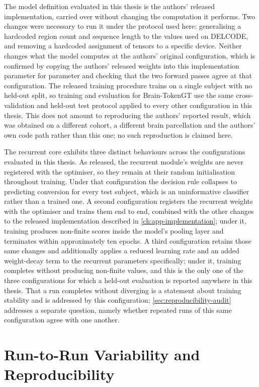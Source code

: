 The model definition evaluated in this thesis is the authors' released implementation,
carried over without changing the computation it performs. Two changes were necessary to
run it under the protocol used here: generalising a hardcoded region count and sequence
length to the values used on \ac{DELCODE}, and removing a hardcoded assignment of tensors
to a specific device. Neither changes what the model computes at the authors' original
configuration, which is confirmed by copying the authors' released
weights into this implementation parameter for parameter and checking that the two forward
passes agree at that configuration. The released training procedure trains on a single
subject with no held-out split, so training and evaluation for Brain-TokenGT use the same
cross-validation and held-out test protocol applied to every other configuration in this
thesis. This
does not amount to reproducing the authors' reported result, which was obtained on a
different cohort, a different brain parcellation and the authors' own code path rather than
this one; no such reproduction is claimed here.

The recurrent core exhibits three distinct behaviours across the configurations evaluated
in this thesis. As released, the recurrent module's weights are never registered with the
optimiser, so they remain at their random initialisation throughout training. Under that
configuration the decision rule collapses to predicting conversion for every test subject,
which is an uninformative classifier rather than a trained one. A second configuration
registers the recurrent weights with the optimiser and trains them end to end, combined
with the other changes to the released implementation described in
\autoref{ch:app-implementation}; under it, training produces non-finite scores inside the
model's pooling layer and terminates within approximately ten epochs. A third configuration
retains those same changes and additionally applies a reduced learning rate and an added
weight-decay term to the recurrent parameters specifically; under it, training completes
without producing non-finite values, and this is the only one of the three configurations
for which a held-out evaluation is reported anywhere in this thesis. That a run completes
without diverging is a statement about training stability and is addressed by this
configuration; \autoref{sec:reproducibility-audit} addresses a separate question, namely
whether repeated runs of this same configuration agree with one another.

\section{Run-to-Run Variability and Reproducibility}\label{sec:reproducibility-audit}

